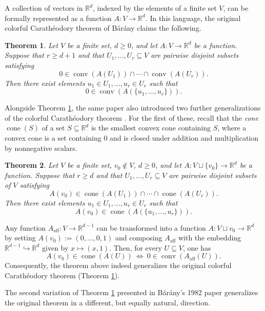\documentclass[a4paper,11pt,reqno, english]{amsart}
\newtheorem{theorem}{Theorem}[section]
\theoremstyle{definition}
\theoremstyle{remark}
\newcommand\R{\mathbb R}
\DeclareMathOperator{\cone}{\mathrm{cone}}
\DeclareMathOperator{\conv}{\mathrm{conv}}
\begin{document}
\medskip
A collection of vectors in $\R^d$, indexed by the elements of a finite set $V$, can be formally represented as a function $A\colon V\to\R^d$. In this language, the original colorful Carath\'eodory theorem of B\'ar\'any \cite[Thm.\,2.1]{Barany1982} claims the following.

\begin{theorem}\label{thm:caratheodory:original}
Let $V$ be a finite set, $d\ge 0$, and let $A\colon V\to\R^d$ be a function. 
Suppose that $r\ge d+1$ and that $U_1,\dots,U_r\subseteq V$ are pairwise disjoint subsets satisfying
\[0\in\conv(A(U_1))\cap\cdots\cap\conv(A(U_r)).\]
Then there exist elements $u_1\in U_1,\ldots,u_r\in U_r$ such that 
\[0\in\conv(A(\{u_1,\ldots,u_r\})).\]
\end{theorem}

Alongside Theorem \ref{thm:caratheodory:original}, the same paper also introduced two further generalizations of the colorful Carath\'eodory theorem \cite[Thm.\,2.2 and Thm.\,2.3]{Barany1982}. 
For the first of these, recall that the \emph{cone} $\cone(S)$ of a set $S\subseteq\R^d$ is the smallest convex cone containing $S$, where a convex cone is a set containing $0$ and is closed under addition and multiplication by nonnegative scalars.

\begin{theorem}\label{thm:caratheodory:cone}
Let $V$ be a finite set, $v_0\notin V$, $d\geq 0$, and let $A\colon {V\sqcup\{v_0\}}\to\R^d$ be a function. 
Suppose that $r\geq d$ and that $U_1,\ldots,U_r\subseteq V$ are pairwise disjoint subsets of $V$ satisfying 
\[A(v_0)\in\cone(A(U_1))\cap\cdots\cap\cone(A(U_r)).\] 
Then there exist elements $u_1\in U_1,\ldots,u_r\in U_r$ such that 
\[A(v_0)\in\cone(A(\{u_1,\ldots,u_r\})).\]
\end{theorem}

Any function $A_{\operatorname{aff}}\colon V\to\R^{d-1}$ can be transformed into a function $A\colon V\sqcup{v_0}\to\R^d$ by setting $A(v_0):=(0,\ldots,0,1)$ and composing $A_{\operatorname{aff}}$ with the embedding $\R^{d-1}\hookrightarrow\R^d$ given by $x\mapsto(x,1)$. 
Then, for every $U\subseteq V$, one has
\[
A(v_0)\in\cone(A(U)) \ \Longleftrightarrow \ 0\in\conv(A_{\operatorname{aff}}(U)).
\]
Consequently, the theorem above indeed generalizes the original colorful Carath\'eodory theorem (Theorem \ref{thm:caratheodory:original}).

\medskip
The second variation of Theorem \ref{thm:caratheodory:original} presented in B\'ar\'any’s 1982 paper \cite[Thm.\, 2.3]{Barany1982} generalizes the original theorem in a different, but equally natural, direction.
\end{document}
